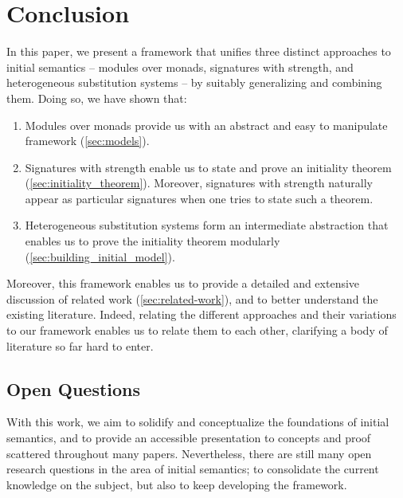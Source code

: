 \section{Conclusion}
\label{sec:conclusion}


%

%

In this paper, we present a framework that unifies three distinct approaches to
initial semantics -- modules over monads, signatures with strength, and
heterogeneous substitution systems -- by suitably generalizing and combining them.
%
Doing so, we have shown that:

%
%
%
\begin{enumerate}
  \setlength\itemsep{-1pt}
  \item Modules over monads provide us with an abstract and easy to manipulate framework (\cref{sec:models}).
  \item Signatures with strength enable us to state and prove an initiality theorem (\cref{sec:initiality_theorem}).
        Moreover, signatures with strength naturally appear as particular
        signatures when one tries to state such a theorem.
  \item Heterogeneous substitution systems form an intermediate abstraction that
        enables us to prove the initiality theorem modularly (\cref{sec:building_initial_model}).
\end{enumerate}

\noindent Moreover, this framework enables us to provide a detailed and
extensive discussion of related work (\cref{sec:related-work}), and to better understand the
existing literature.
%
Indeed, relating the different approaches and their variations to our framework
enables us to relate them to each other, clarifying a body of literature so far hard to enter.


\subsection{Open Questions}

With this work, we aim to solidify and conceptualize the foundations of
initial semantics, and to provide an accessible presentation to concepts and
proof scattered throughout many papers.
%
%
Nevertheless, there are still many open research questions in the area of
initial semantics; to consolidate the current knowledge on the subject, but
also to keep developing the framework.

%
%
%
%
%
%

